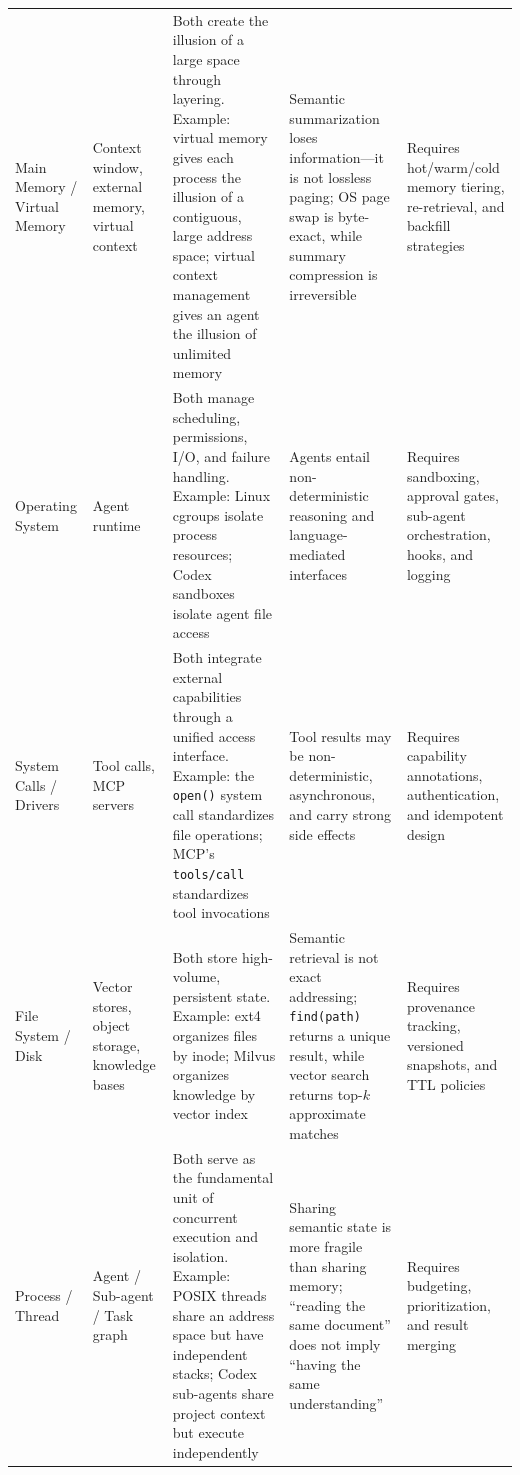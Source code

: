 \documentclass[11pt,a4paper]{article}
\begin{document}
\begin{table}[t]
\begin{tabularx}{\textwidth}{p{}p{}Y Y Y}
Main Memory / Virtual Memory & Context window, external memory, virtual context & Both create the illusion of a large space through layering. Example: virtual memory gives each process the illusion of a contiguous, large address space; virtual context management gives an agent the illusion of unlimited memory\cite{memgpt2023} & Semantic summarization loses information---it is not lossless paging; OS page swap is byte-exact, while summary compression is irreversible & Requires hot/warm/cold memory tiering, re-retrieval, and backfill strategies \\
Operating System & Agent runtime & Both manage scheduling, permissions, I/O, and failure handling. Example: Linux cgroups isolate process resources\cite{linux_cgroup_2026}; Codex sandboxes isolate agent file access\cite{openai_codex_sandbox_2026} & Agents entail non-deterministic reasoning and language-mediated interfaces & Requires sandboxing, approval gates, sub-agent orchestration, hooks, and logging \\
System Calls / Drivers & Tool calls, MCP servers & Both integrate external capabilities through a unified access interface. Example: the \texttt{open()} system call standardizes file operations; MCP's \texttt{tools/call} standardizes tool invocations\cite{mcp_intro_2026} & Tool results may be non-deterministic, asynchronous, and carry strong side effects & Requires capability annotations, authentication, and idempotent design \\
File System / Disk & Vector stores, object storage, knowledge bases & Both store high-volume, persistent state. Example: ext4 organizes files by inode; Milvus organizes knowledge by vector index\cite{lewis2020rag} & Semantic retrieval is not exact addressing; \texttt{find(path)} returns a unique result, while vector search returns top-$k$ approximate matches & Requires provenance tracking, versioned snapshots, and TTL policies \\
Process / Thread & Agent / Sub-agent / Task graph & Both serve as the fundamental unit of concurrent execution and isolation. Example: POSIX threads share an address space but have independent stacks; Codex sub-agents share project context but execute independently\cite{openai_codex_subagents_2026} & Sharing semantic state is more fragile than sharing memory; ``reading the same document'' does not imply ``having the same understanding'' & Requires budgeting, prioritization, and result merging \\
\bottomrule
\end{tabularx}
\end{table}
\end{document}
